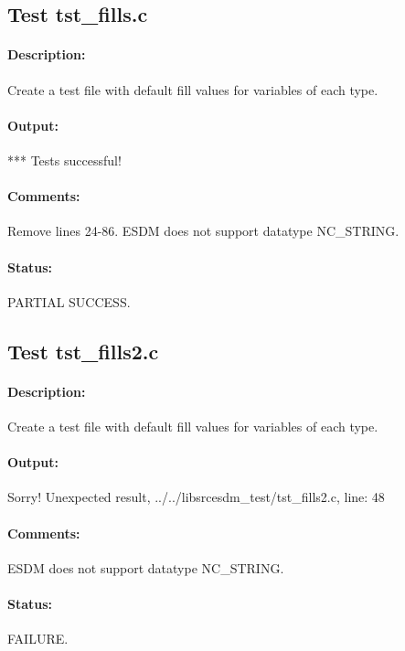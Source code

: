 \subsection{Test tst\_fills.c}

\paragraph{Description:} Create a test file with default fill values for variables of each type.

\paragraph{Output:} *** Tests successful!

\paragraph{Comments:} Remove lines 24-86. ESDM does not support datatype NC\_STRING.

\paragraph{Status:} PARTIAL SUCCESS.

\subsection{Test tst\_fills2.c}

\paragraph{Description:} Create a test file with default fill values for variables of each type.

\paragraph{Output:} Sorry! Unexpected result, ../../libsrcesdm\_test/tst\_fills2.c, line: 48

\paragraph{Comments:} ESDM does not support datatype NC\_STRING.

\paragraph{Status:} FAILURE.

